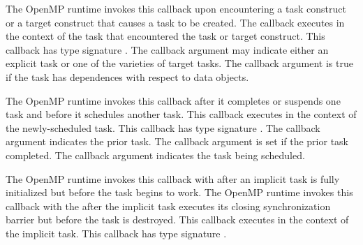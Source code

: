 \documentclass{article}
\newcommand{\descheader}[1]{{\needspace{3\baselineskip}\vspace{1em}\noindent \fbox{#1}}}
\begin{document}
\begin{description}

\item {}
 
The OpenMP runtime invokes this callback
upon encountering a task construct or a target construct that causes a task to be created. 
The callback executes in the context of
the task that encountered the task or target construct.
This callback has type signature .
The callback argument  may indicate either an explicit task or one of the varieties of target tasks.
The callback argument  is true if the task has dependences with respect to data objects.

\item {}

 The OpenMP runtime invokes this callback after it
 completes or suspends one task and before it schedules another task.  This
 callback executes in the context of the newly-scheduled task.  
   This callback has type signature . 
  The callback argument  indicates the prior task.
  The callback argument  is set if the prior task completed.
  The callback argument  indicates the task being scheduled. 

\item {}

      The OpenMP runtime invokes this callback with  after an
   implicit task is fully initialized but before the task begins to work.
   The OpenMP runtime invokes this callback with the  after the implicit
   task executes its closing synchronization barrier but before
   the task is destroyed.
   This callback executes in the context of the implicit task.
     This callback has type signature . 
   
\end{description}

\descheader{Target Regions}
\end{document}
